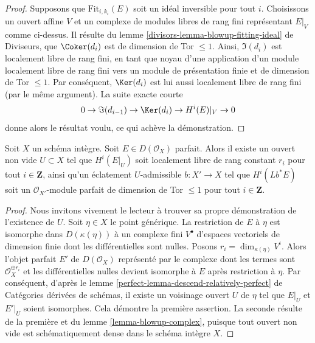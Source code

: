 \begin{proof}
\medskip\noindent
Supposons que $\text{Fit}_{i, k_i}(E)$ soit un idéal inversible pour tout $i$.
Choisissons un ouvert affine $V$ et un complexe de modules libres de rang fini
représentant $E|_V$ comme ci-dessus. Il résulte du
lemme \ref{divisors-lemma-blowup-fitting-ideal} de Diviseurs,
que $\Coker(d_i)$ est de dimension de Tor $\leq 1$. Ainsi,
$\Im(d_i)$ est localement libre de rang fini, en tant que noyau d'une application
d'un module localement libre de rang fini vers un module de présentation finie
et de dimension de Tor $\leq 1$. Par conséquent, $\Ker(d_i)$
est lui aussi localement libre de rang fini (par le même argument). La suite
exacte courte
$$
0 \to \Im(d_{i - 1}) \to \Ker(d_i) \to H^i(E)|_V \to 0
$$
donne alors le résultat voulu, ce qui achève la démonstration.
\end{proof}

\begin{lemma}
\label{lemma-blowup-complex-integral}
Soit $X$ un schéma intègre. Soit $E \in D(\mathcal{O}_X)$ parfait.
Alors il existe un ouvert non vide $U \subset X$
tel que $H^i(E|_U)$ soit localement libre de rang constant $r_i$
pour tout $i \in \mathbf{Z}$, ainsi qu'un éclatement $U$-admissible
$b : X' \to X$ tel que $H^i(Lb^*E)$ soit un
$\mathcal{O}_{X'}$-module parfait de dimension de Tor $\leq 1$ pour tout $i \in \mathbf{Z}$.
\end{lemma}

\begin{proof}
Nous invitons vivement le lecteur à trouver sa propre démonstration de
l'existence de $U$. Soit $\eta \in X$ le point générique.
La restriction de $E$ à $\eta$ est isomorphe dans $D(\kappa(\eta))$ à un
complexe fini $V^\bullet$ d'espaces vectoriels de dimension finie dont les
différentielles sont nulles. Posons $r_i = \dim_{\kappa(\eta)} V^i$.
Alors l'objet parfait $E'$ de $D(\mathcal{O}_X)$ représenté par le complexe
dont les termes sont $\mathcal{O}_X^{\oplus r_i}$ et les différentielles nulles
devient isomorphe à $E$ après restriction à $\eta$.
Par conséquent, d'après le lemme
\ref{perfect-lemma-descend-relatively-perfect} de Catégories dérivées de schémas,
il existe un voisinage ouvert $U$ de $\eta$ tel que $E|_U$ et $E'|_U$
soient isomorphes. Cela démontre la première assertion. La seconde résulte de la
première et du lemme \ref{lemma-blowup-complex}, puisque tout ouvert non vide est
schématiquement dense dans le schéma intègre $X$.
\end{proof}

